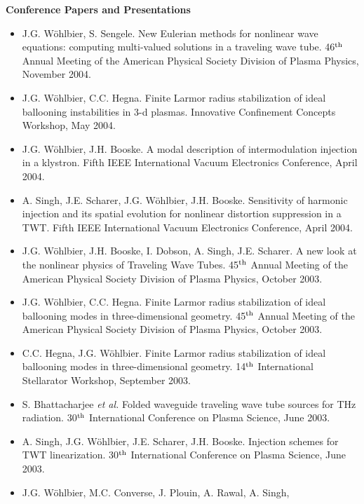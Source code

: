 {\bf\large Conference Papers and Presentations}
\begin{itemize}
\item J.G. W\"ohlbier, S. Sengele. New Eulerian methods for nonlinear
  wave equations: computing multi-valued solutions in a traveling wave
  tube. 46$^{\rm th}$ Annual Meeting of the American Physical Society
  Division of Plasma Physics, November 2004.
\item J.G. W\"ohlbier, C.C. Hegna. Finite Larmor radius stabilization
  of ideal ballooning instabilities in 3-d plasmas.
  Innovative Confinement Concepts Workshop, May 2004.
\item J.G. W\"ohlbier, J.H. Booske. A modal description of
  intermodulation injection in a klystron. Fifth IEEE International
  Vacuum Electronics Conference, April 2004.
\item A. Singh, J.E. Scharer, J.G. W\"ohlbier,
  J.H. Booske. Sensitivity of harmonic injection and its spatial
  evolution for nonlinear distortion suppression in a TWT.
  Fifth IEEE International Vacuum Electronics Conference, April 2004.
\item J.G. W\"ohlbier, J.H. Booske, I. Dobson, A. Singh,
  J.E. Scharer. A new look at the nonlinear physics of Traveling Wave
  Tubes. 45$^{\rm th}$ Annual Meeting of the American Physical Society
  Division of Plasma Physics, October 2003.
\item J.G. W\"ohlbier, C.C. Hegna. Finite Larmor radius stabilization
  of ideal ballooning modes in three-dimensional geometry.
  45$^{\rm th}$ Annual Meeting of the American Physical Society
  Division of Plasma Physics, October 2003.
\item C.C. Hegna, J.G. W\"ohlbier. Finite Larmor radius stabilization
  of ideal ballooning modes in three-dimensional geometry.
  14$^{\rm th}$ International Stellarator Workshop, September 2003.
\item S. Bhattacharjee {\it et al.} Folded waveguide traveling wave
  tube sources for THz radiation. 30$^{\rm th}$ International
  Conference on Plasma Science, June 2003.
\item A. Singh, J.G. W\"ohlbier, J.E. Scharer, J.H. Booske. Injection
  schemes for TWT linearization. 30$^{\rm th}$ International
  Conference on Plasma Science, June 2003.
\item J.G. W\"ohlbier, M.C. Converse, J. Plouin, A. Rawal, A. Singh,

\end{itemize}
